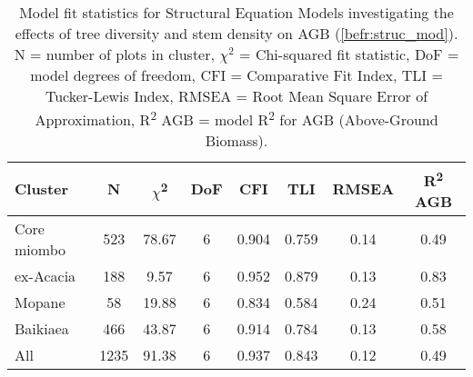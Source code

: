 \begin{table}
	\caption[Model fit statistics per vegetation type]{Model fit statistics for Structural Equation Models investigating the effects of tree diversity and stem density on AGB (\autoref{befr:struc_mod}). N = number of plots in cluster, $\chi^{2}$ = Chi-squared fit statistic, DoF = model degrees of freedom, CFI = Comparative Fit Index, TLI = Tucker-Lewis Index, RMSEA = Root Mean Square Error of Approximation, R\textsuperscript{2} AGB = model R\textsuperscript{2} for AGB (Above-Ground Biomass).} 
	\label{befr:struc_model_fit_clust_stats} 
	\begin{tabular}{lS[table-format=4.0]S[table-format=2.2]S[table-format=1.0]S[table-format=1.3]S[table-format=1.3]S[table-format=1.3]S[table-format=1.3]} 
\toprule
{Cluster} & {N} & {$\chi$\textsuperscript{2}} & {DoF} & {CFI} & {TLI} & {RMSEA} & {R\textsuperscript{2} AGB} \\
\midrule
Core miombo & 523 & 78.67 & 6 & 0.904 & 0.759 & 0.14 & 0.49 \\ 
ex-Acacia & 188 & 9.57 & 6 & 0.952 & 0.879 & 0.13 & 0.83 \\ 
Mopane & 58 & 19.88 & 6 & 0.834 & 0.584 & 0.24 & 0.51 \\ 
Baikiaea & 466 & 43.87 & 6 & 0.914 & 0.784 & 0.13 & 0.58 \\ 
All & 1235 & 91.38 & 6 & 0.937 & 0.843 & 0.12 & 0.49 \\ 
\bottomrule
\end{tabular} 
\end{table} 
